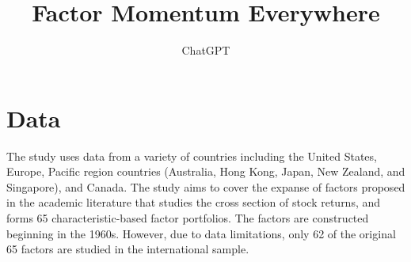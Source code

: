 \documentclass{article}
\title{Factor Momentum Everywhere}
\author{ChatGPT}
\begin{document}
 

\maketitle
\section{Data}
The study uses data from a variety of countries including the United States, Europe, Pacific region countries (Australia, Hong Kong, Japan, New Zealand, and Singapore), and Canada. The study aims to cover the expanse of factors proposed in the academic literature that studies the cross section of stock returns, and forms 65 characteristic-based factor portfolios. The factors are constructed beginning in the 1960s. However, due to data limitations, only 62 of the original 65 factors are studied in the international sample. 
\end{document}
